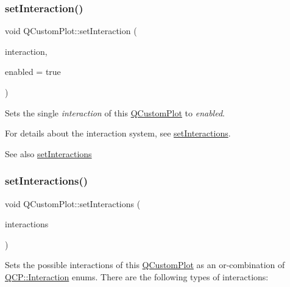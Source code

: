 \subsubsection{\texorpdfstring{setInteraction()}{setInteraction()}}
{\footnotesize\ttfamily void Q\+Custom\+Plot\+::set\+Interaction (\begin{DoxyParamCaption}\item[{const \mbox{\hyperlink{namespace_q_c_p_a2ad6bb6281c7c2d593d4277b44c2b037}{Q\+C\+P\+::\+Interaction}} \&}]{interaction,  }\item[{bool}]{enabled = {\ttfamily true} }\end{DoxyParamCaption})}

Sets the single {\itshape interaction} of this \mbox{\hyperlink{class_q_custom_plot}{Q\+Custom\+Plot}} to {\itshape enabled}.

For details about the interaction system, see \mbox{\hyperlink{class_q_custom_plot_a5ee1e2f6ae27419deca53e75907c27e5}{set\+Interactions}}.

\begin{DoxySeeAlso}{See also}
\mbox{\hyperlink{class_q_custom_plot_a5ee1e2f6ae27419deca53e75907c27e5}{set\+Interactions}} 
\end{DoxySeeAlso}
\mbox{\label{class_q_custom_plot_a5ee1e2f6ae27419deca53e75907c27e5}} 
\subsubsection{\texorpdfstring{setInteractions()}{setInteractions()}}
{\footnotesize\ttfamily void Q\+Custom\+Plot\+::set\+Interactions (\begin{DoxyParamCaption}\item[{const Q\+C\+P\+::\+Interactions \&}]{interactions }\end{DoxyParamCaption})}

Sets the possible interactions of this \mbox{\hyperlink{class_q_custom_plot}{Q\+Custom\+Plot}} as an or-\/combination of \mbox{\hyperlink{namespace_q_c_p_a2ad6bb6281c7c2d593d4277b44c2b037}{Q\+C\+P\+::\+Interaction}} enums. There are the following types of interactions\+:


